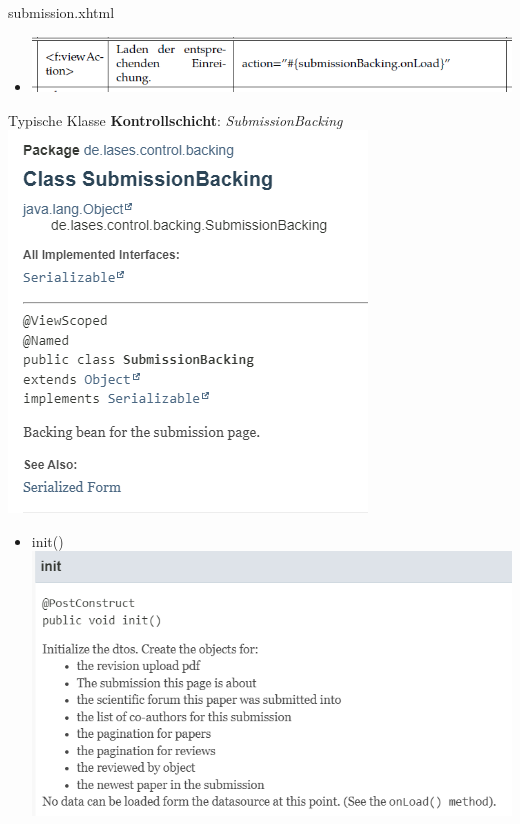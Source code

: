 \documentclass{beamer}
\begin{document}
\begin{frame}{submission.xhtml}
\begin{itemize}
            \item <f:viewAction>
            \centering
            \includegraphics[height=1.1\textheight]{graphics/facelet/fac_onLoad}
        \end{itemize}
    \end{frame}

    \begin{frame}{Typische Klasse \textbf{Kontrollschicht}:}
        \emph{SubmissionBacking}
        \centering
        \includegraphics[height=1.1\textheight]{graphics/backing/doc_backing}
        \pause
        \begin{itemize}
            \item init()
            \centering
            \includegraphics[height=1.1\textheight]{graphics/backing/doc_init}


\end{itemize}
\end{frame}
\end{document}

